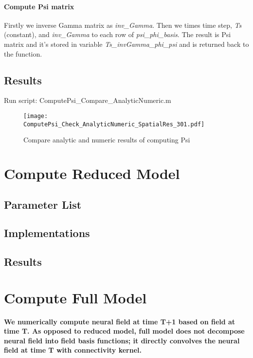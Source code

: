 \documentclass[a4paper, 12pt, english]{article}
\begin{document}
\paragraph{Compute Psi matrix\newline}
Firstly we inverse Gamma matrix as \textit{inv\_Gamma}. Then we times time step, \textit{Ts} (constant), and \textit{inv\_Gamma} to each row of \textit{psi\_phi\_basis}.
The result is Psi matrix and it's stored in variable \textit{Ts\_invGamma\_phi\_psi} and is returned back to the function.

\subsection{Results}
Run script: ComputePsi\_Compare\_AnalyticNumeric.m
\begin{figure}[H]
\centering
\texttt{[image: ComputePsi\_Check\_AnalyticNumeric\_SpatialRes\_301.pdf]}
\caption{Compare analytic and numeric results of computing Psi}
\end{figure}
\newpage




\section{Compute Reduced Model}
\subsection{Parameter List}
\subsection{Implementations}
\subsection{Results}

\newpage





\section{Compute Full Model}
\paragraph{We numerically compute neural field at time T+1 based on field at time T.
As opposed to reduced model, full model does not decompose neural field into field basis functions; it directly convolves
the neural field at time T with connectivity kernel.}
\end{document}
